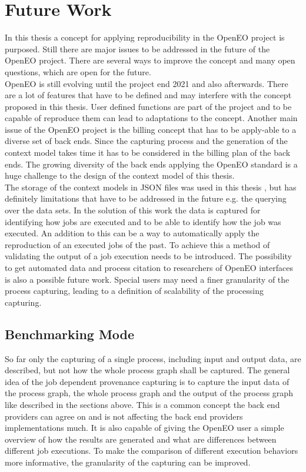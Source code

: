 \documentclass[draft,final]{vutinfth} %
\begin{document}
\section{Future Work}\label{FutureWork}
In this thesis a concept for applying reproducibility in the OpenEO project is purposed. Still there are major issues to be addressed in the future of the OpenEO project. There are several ways to improve the concept and many open questions, which are open for the future. \\
OpenEO is still evolving until the project end 2021 and also afterwards. There are a lot of features that have to be defined and may interfere with the concept proposed in this thesis. User defined functions are part of the project and to be capable of reproduce them can lead to adaptations to the concept. Another main issue of the OpenEO project is the billing concept that has to be apply-able to a diverse set of back ends. Since the capturing process and the generation of the context model takes time it has to be considered in the billing plan of the back ends. The growing diversity of the back ends applying the OpenEO standard is a huge challenge to the design of the context model of this thesis.\\
The storage of the context models in JSON files was used in this thesis , but has definitely limitations that have to be addressed in the future e.g. the querying over the data sets. 
In the solution of this work the data is captured for identifying how jobs are executed and to be able to identify how the job was executed. An addition to this can be a way to automatically apply the reproduction of an executed jobs of the past. To achieve this a method of validating the output of a job execution needs to be introduced. The possibility to get automated data and process citation to researchers of OpenEO interfaces is also a possible future work. Special users may need a finer granularity of the process capturing, leading to a definition of scalability of the processing capturing.      

\subsection{Benchmarking Mode}\label{Job:Benchmarking}

So far only the capturing of a single process, including input and output data, are described, but not how the whole process graph shall be captured. The general idea of the job dependent provenance capturing is to capture the input data of the process graph, the whole process graph and the output of the process graph like described in the sections above. This is a common concept the back end providers can agree on and is not affecting the back end providers implementations much. It is also capable of giving the OpenEO user a simple overview of how the results are generated and what are differences between different job executions. 
To make the comparison of different execution behaviors more informative, the granularity of the capturing can be improved. 
\end{document}
